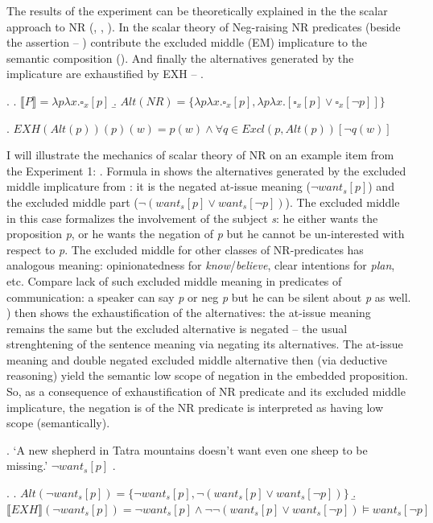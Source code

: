 \documentclass[12pt]{scrartcl}
\begin{document}
The results of the experiment can be theoretically explained in the the scalar approach to NR (\citealt{horn1973semantic}, \citealt{romoli2012soft}, \citealt{romoli2013scalar}). In the scalar theory of Neg-raising  NR predicates (beside the assertion -- \Next[a]) contribute the  excluded middle (EM) implicature to the semantic composition (\Next[b]). And finally the   alternatives generated by the implicature are exhaustified by EXH -- \NNext.

\ex. \a. \(\llbracket P \rrbracket = \lambda p\lambda x.\square_x[p]\)
\b.
\(Alt(NR)=\{\lambda p\lambda x.\square_x[p],\lambda p\lambda x.[\square_x[p] \vee \square_x[\neg p]]\}\)

\ex.
\(EXH(Alt(p))(p)(w) = p(w) \wedge \forall q \in Excl(p,Alt(p))[\neg q(w)]\)

I will illustrate the mechanics of scalar theory of NR on an example item from the Experiment 1: \Next. Formula in \NNext[a] shows the alternatives generated by the excluded middle implicature from \LLast[b]: it is the negated at-issue meaning ($\neg want_s[p]$) and the excluded middle part ($\neg(want_s[p] \vee want_s[\neg p])$). The excluded middle in this case formalizes the involvement of the subject \textit{s}: he either wants the proposition \textit{p}, or he wants the negation of \textit{p} but he cannot be un-interested with respect to \textit{p}. The excluded middle for other classes of NR-predicates has analogous meaning: opinionatedness for \textit{know}/\textit{believe}, clear intentions for \textit{plan}, etc. Compare lack of such excluded middle meaning in predicates of communication: a speaker can say \textit{p} or neg \textit{p} but he can be silent about \textit{p} as well. \Next[b]) then shows the exhaustification of the alternatives: the at-issue meaning remains the same but the excluded alternative is negated -- the usual strenghtening of the sentence meaning via negating its alternatives. The at-issue meaning and double negated excluded middle alternative then (via deductive reasoning) yield the semantic low scope of negation in the embedded proposition. So, as a consequence of exhaustification of NR predicate and its excluded middle implicature, the negation is of the NR predicate is interpreted as having low scope (semantically).
  

\ex. `A new shepherd in Tatra mountains doesn't want even one sheep to
be missing.' \(\neg want_s[p]\) .

\ex. \a.
\(Alt(\neg want_s[p])=\{\neg want_s[p], \neg(want_s[p] \vee want_s[\neg p])\}\)
\b.
\(\llbracket EXH\rrbracket (\neg want_s[p])=\neg want_s[p] \wedge \neg \neg(want_s[p] \vee want_s[\neg p]) \models want_s[\neg p]\)
\end{document}
